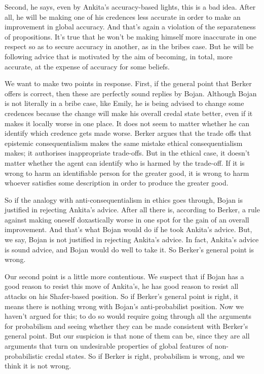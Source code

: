 Second, he says, even by Ankita's accuracy-based lights, this is a bad idea. After all, he will be making one of his credences less accurate in order to make an improvement in global accuracy. And that's again a violation of the separateness of propositions. It's true that he won't be making himself more inaccurate in one respect so as to secure accuracy in another, as in the bribes case. But he will be following advice that is motivated by the aim of becoming, in total, more accurate, at the expense of accuracy for some beliefs.

We want to make two points in response. First, if the general point that Berker offers is correct, then these are perfectly sound replies by Bojan. Although Bojan is not literally in a bribe case, like Emily, he is being advised to change some credences because the change will make his overall credal state better, even if it makes it locally worse in one place. It does not seem to matter whether he can identify which credence gets made worse. Berker argues that the trade offs that epistemic consequentialism makes the same mistake ethical consequentialism makes; it authorises inappropriate trade-offs. But in the ethical case, it doesn't matter whether the agent can identify who is harmed by the trade-off. If it is wrong to harm an identifiable person for the greater good, it is wrong to harm whoever satisfies some description in order to produce the greater good.

So if the analogy with anti-consequentialism in ethics goes through, Bojan is justified in rejecting Ankita's advice. After all there is, according to Berker, a rule against making oneself doxastically worse in one spot for the gain of an overall improvement. And that's what Bojan would do if he took Ankita's advice. But, we say, Bojan is not justified in rejecting Ankita's advice. In fact, Ankita's advice is sound advice, and Bojan would do well to take it. So Berker's general point is wrong.

Our second point is a little more contentious. We suspect that if Bojan has a good reason to resist this move of Ankita's, he has good reason to resist all attacks on his Shafer-based position. So if Berker's general point is right, it means there is nothing wrong with Bojan's anti-probabilist position. Now we haven't argued for this; to do so would require going through all the arguments for probabilism and seeing whether they can be made consistent with Berker's general point. But our suspicion is that none of them can be, since they are all arguments that turn on undesirable properties of global features of non-probabilistic credal states. So if Berker is right, probabilism is wrong, and we think it is not wrong.


